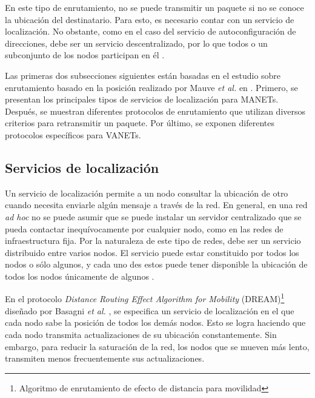 En este tipo de enrutamiento, no se puede transmitir un paquete si no se conoce
la ubicación del destinatario. Para esto, es necesario contar con un servicio de
localización. No obstante, como en el caso del servicio de autoconfiguración de
direcciones, debe ser un servicio descentralizado, por lo que todos o un
subconjunto de los nodos participan en él \cite{DeMoraisCordeiro2006}.

Las primeras dos subsecciones siguientes están basadas en el estudio sobre
enrutamiento basado en la posición realizado por Mauve \textit{et al.} en
\cite{Mauve2001}. Primero, se presentan los principales tipos de servicios de
localización para MANETs. Después, se muestran diferentes protocolos de
enrutamiento que utilizan diversos criterios para retransmitir un paquete. Por
último, se exponen diferentes protocolos específicos para VANETs.

\subsection{Servicios de localización}

\label{subsec:servicios_de_localizacion}

Un servicio de localización permite a un nodo consultar la ubicación de otro
cuando necesita enviarle algún mensaje a través de la red. En general, en una
red \textit{ad hoc} no se puede asumir que se puede instalar un servidor
centralizado que se pueda contactar inequívocamente por cualquier nodo, como en
las redes de infraestructura fija. Por la naturaleza de este tipo de redes, debe
ser un servicio distribuido entre varios nodos. El servicio puede estar
constituido por todos los nodos o sólo algunos, y cada uno des estos puede
tener disponible la ubicación de todos los nodos únicamente de algunos
\cite{DeMoraisCordeiro2006}.

En el protocolo \textit{Distance Routing Effect Algorithm for Mobility}
(DREAM)\footnote{Algoritmo de enrutamiento de efecto de distancia para
movilidad} diseñado por Basagni \textit{et al.} \cite{Basagni1998}, se
especifica un servicio de localización en el que cada nodo sabe la posición de
todos los demás nodos. Esto se logra haciendo que cada nodo transmita
actualizaciones de su ubicación constantemente. Sin embargo, para reducir la
saturación de la red, los nodos que se mueven más lento, transmiten menos
frecuentemente sus actualizaciones.

